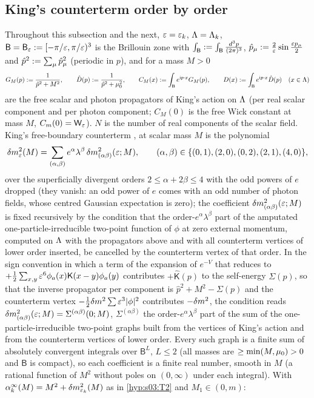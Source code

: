 \providecommand{\BZ}{\ensuremath{\mathsf B}}

\subsection*{King's counterterm order by order}

Throughout this subsection and the next, $\varepsilon=\varepsilon_k$, $\Lambda=\Lambda_k$, $\BZ=\BZ_\eps\defeq[-\pi/\eps,\pi/\eps)^3$ is the Brillouin zone with $\int_\BZ\defeq\int_\BZ\frac{d^3p}{(2\pi)^3}$, $\hat p_\mu:=\frac2{\varepsilon}\sin\frac{\varepsilon p_\mu}2$ and $\hat p^2:=\sum_\mu\hat p_\mu^2$ (periodic in $p$), and for a mass $M>0$
\[
G_M(p)\defeq\frac1{\hat p^2+M^2},\qquad \hat D(p)\defeq\frac1{\hat p^2+\lmu^2},\qquad C_M(x)\defeq\int_\BZ e^{\mathrm ip\cdot x}G_M(p),\qquad D(x)\defeq\int_\BZ e^{\mathrm ip\cdot x}\hat D(p)\quad(x\in\Lam)
\]
are the free scalar and photon propagators of King's action on $\Lambda$ (per real scalar component and per photon component; $C_M(0)$ is the free Wick constant at mass $M$, $C_m(0)=\mathsf W_{\varepsilon}$). $N$ is the number of real components of the scalar field. King's free-boundary counterterm \cite[(3.32)--(3.33)]{K1}, \cite[p.~330]{K2} at scalar mass $M$ is the polynomial
\begin{equation}\label{eq:s14:CTdef}
\delta m^2_{\varepsilon}(M)=\sum_{(\alpha,\beta)}e^\alpha\lambda^\beta\,\delta m^2_{(\alpha\beta)}(\varepsilon;M),\qquad(\alpha,\beta)\in\{(0,1),(2,0),(0,2),(2,1),(4,0)\},
\end{equation}
over the superficially divergent orders $2\le\alpha+2\beta\le4$ with the odd powers of $e$ dropped (they vanish: an odd power of $e$ comes with an odd number of photon fields, whose centred Gaussian expectation is zero); the coefficient $\delta m^2_{(\alpha\beta)}(\varepsilon;M)$ is fixed recursively by the condition that the order-$e^\alpha\lambda^\beta$ part of the amputated one-particle-irreducible two-point function of $\phi$ at zero external momentum, computed on $\Lambda$ with the propagators above and with all counterterm vertices of lower order inserted, be cancelled by the counterterm vertex of that order. In the sign convention in which a term of the expansion of $e^{-V}$ that reduces to $+\frac12\sum_{x,y}\varepsilon^6\phi_a(x)\mathsf K(x-y)\phi_a(y)$ contributes $+\hat{\mathsf K}(p)$ to the self-energy $\Sigma(p)$, so that the inverse propagator per component is $\hat p^2+M^2-\Sigma(p)$ and the counterterm vertex $-\frac12\delta m^2\sum\varepsilon^3|\phi|^2$ contributes $-\delta m^2$, the condition reads $\delta m^2_{(\alpha\beta)}(\varepsilon;M)=\Sigma^{(\alpha\beta)}(0;M)$, $\Sigma^{(\alpha\beta)}$ the order-$e^\alpha\lambda^\beta$ part of the sum of the one-particle-irreducible two-point graphs built from the vertices of King's action and from the counterterm vertices of lower order. Every such graph is a finite sum of absolutely convergent integrals over $\BZ^L$, $L\le2$ (all masses are $\ge\min(M,\mu_0)>0$ and $\BZ$ is compact), so each coefficient is a finite real number, smooth in $M$ (a rational function of $M^2$ without poles on $(0,\infty)$ under each integral). With $\alpha^\infty_k(M)=M^2+\delta m^2_{\varepsilon_k}(M)$ as in \cref{hyp:s03:T2} and $M_1\in(0,m)$:

